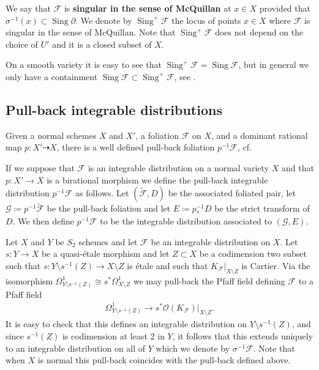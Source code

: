 \documentclass[12pt, a4paper]{amsart}
\DeclareMathOperator{\sing}{Sing}
\theoremstyle{definition}
\theoremstyle{named}
\begin{document}
We say that $\mathcal F$ is {\bf singular in the sense of McQuillan} at $x \in X$ provided that  $\sigma^{-1}(x) \subset \sing \partial$.
We denote by $\sing^+{\mathcal F}$ the locus of points $x \in X$ where $\mathcal F$ is singular in the sense 
of McQuillan. Note that $\sing^+{\mathcal F}$ does not depend on the choice of $U'$ and it is a closed subset of $X$. 

On a smooth variety it is easy to see that $\sing^+{\mathcal F} = \sing{\mathcal F}$, but in general we only have a containment
$\sing{\mathcal F} \subset \sing^+{\mathcal F}$, see \cite[Lemma 4.1]{CS23b}.





\subsection{Pull-back integrable distributions}
Given a normal schemes $X$ and $X'$, a foliation $\mathcal F$ 
on $X$, and a dominant rational map $p\colon X' \dashrightarrow X$,
there is a well defined pull-back foliation $p^{-1}\mathcal F$, cf.  \cite[\S 2.9]{Druel15b}

If we suppose that $\mathcal F$ is an integrable distribution on a normal variety $X$ and that $p\colon X' \rightarrow X$
is a birational morphism we define the pull-back integrable distribution $p^{-1}\mathcal F$ as follows.
Let $(\tilde{\mathcal F}, D)$ be the associated foliated pair, let $\mathcal G\coloneqq p^{-1}\tilde{\mathcal F}$ be 
the pull-back foliation and let $E \coloneqq p_*^{-1}D$ be the strict transform of $D$.
We then define $p^{-1}\mathcal F$ to be the integrable 
distribution associated to $(\mathcal G, E)$.

Let $X$ and $Y$ be $S_2$ schemes and let $\mathcal F$ be an integrable distribution on $X$. Let $s\colon Y \rightarrow X$ be a quasi-\'etale morphism and let $Z \subset X$ be a codimension two subset such that $s\colon Y \setminus s^{-1}(Z) \rightarrow X\setminus Z$
is \'etale and such that $K_{\mathcal F}\vert_{X\setminus Z}$ is Cartier.
Via the isomorphism $\Omega^1_{Y\setminus s^{-1}(Z)} \cong s^*\Omega^1_{X\setminus Z}$
we may pull-back the Pfaff field defining $\mathcal F$ to a Pfaff field 
\begin{align*}\Omega^1_{Y \setminus s^{-1}(Z)} \rightarrow s^*\mathcal O(K_{\mathcal F})|_{X \setminus Z}.\end{align*}
It is easy to check that this defines an integrable distribution on $Y\setminus s^{-1}(Z)$, and since 
$s^{-1}(Z)$ is codimension at least 2 in $Y$, it follows that this extends uniquely 
to an integrable distribution on all of $Y$ which we denote by $\sigma^{-1}\mathcal F$.
Note that when $X$ is normal this pull-back coincides with the pull-back defined above.
\end{document}
